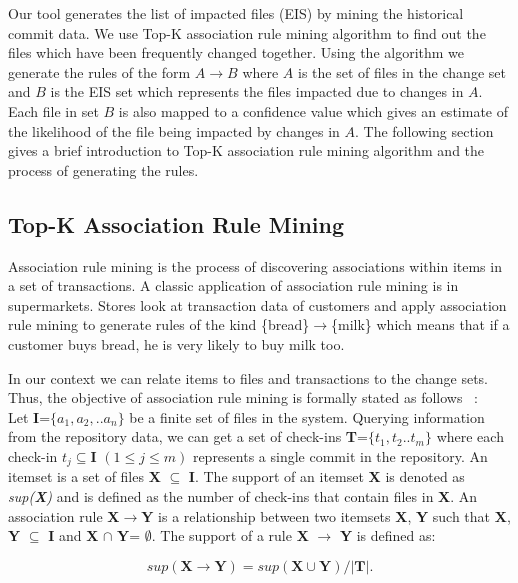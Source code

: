 Our tool generates the list of impacted files (EIS) by mining the historical commit data. We use Top-K association rule mining algorithm to find out the files which have been frequently changed together. Using the algorithm we generate the rules of the form $A \rightarrow B$ where $A$ is the set of files in the change set and $B$ is the EIS set which represents the files impacted due to changes in $A$. Each file in set $B$ is also mapped to a confidence value which gives an estimate of the likelihood of the file being impacted by changes in $A$. The following section gives a brief introduction to Top-K association rule mining algorithm and the process of generating the rules. 

\subsection{Top-K Association Rule Mining}

Association rule mining is the process of discovering associations within items in a set of transactions. A classic application of association rule mining is in supermarkets. Stores look at transaction data of customers and apply association rule mining to generate rules of the kind \{bread\}$\rightarrow$\{milk\} which means that if a customer buys bread, he is very likely to buy milk too.

In our context we can relate items to files and transactions to the change sets. Thus, the objective of association rule mining is formally stated as follows~\cite{fournier2012mining} :\\
Let \textbf{I}=$\{a_{1},a_{2},..a_{n}\}$ be a finite set of files in the system. Querying information from the repository data, we can get a set of check-ins \textbf{T}=$\{t_{1},t_{2}..t_{m}\}$ where each check-in $t_{j}\subseteq\textbf{I}$ $(1 \le j \le m)$ represents a single commit in the repository. An itemset is a set of files \textbf{X} $\subseteq$ \textbf{I}. The support of an itemset \textbf{X} is denoted as \textit{sup(\textbf{X})} and is defined as the number of check-ins that contain files in \textbf{X}. An association rule \textbf{X}$\rightarrow$\textbf{Y} is a relationship between two itemsets \textbf{X}, \textbf{Y} such that \textbf{X}, \textbf{Y} $\subseteq$ \textbf{I} and \textbf{X} $\cap$ \textbf{Y}= $\emptyset$. The support of a rule \textbf{X} $\rightarrow$ \textbf{Y} is defined as: 

\begin{equation}
\textit{sup}(\textbf{X} \rightarrow \textbf{Y}) = \textit{sup}(\textbf{X}\cup\textbf{Y}) / |\textbf{T}|.
\end{equation}
 
